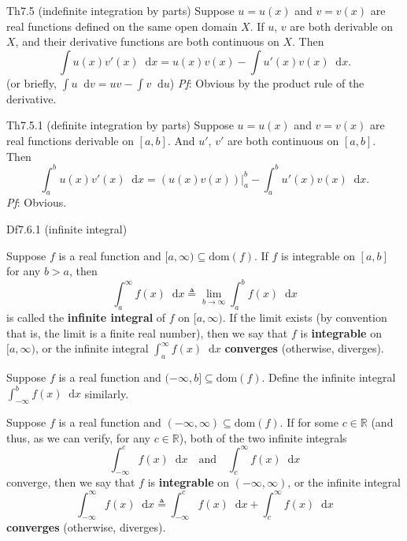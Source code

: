 \documentclass{article}
\newcommand{\dif}{\mathop{}\!\mathrm{d}}
\begin{document}
\begin{Th}{Th7.5 (indefinite integration by parts)}
    Suppose $u = u(x)$ and $v = v(x)$ are real functions defined on the same open domain $X$. If $u$, $v$ are both derivable on $X$, and their derivative functions are both continuous on $X$. Then
    $$\int u(x)v'(x)\dif x = u(x)v(x) - \int u'(x)v(x)\dif x.$$
    (or briefly, $\int u\dif v = uv - \int v\dif u$)
    \tcblower
    \textit{Pf}: Obvious by the product rule of the derivative.
\end{Th}

\begin{Th}{Th7.5.1 (definite integration by parts)}
    Suppose $u = u(x)$ and $v = v(x)$ are real functions derivable on $[a, b]$. And $u'$, $v'$ are both continuous on $[a, b]$. Then
    $$\int_a^b u(x)v'(x)\dif x = \left(u(x)v(x)\right)\Big|_a^b - \int_a^b u'(x)v(x)\dif x.$$
    \tcblower
    \textit{Pf}: Obvious.
\end{Th}

\begin{Df}{Df7.6.1 (infinite integral)}
    \begin{compactenum}
        \item Suppose $f$ is a real function and $[a, \infty)\subseteq\text{dom}(f)$. If $f$ is integrable on $[a, b]$ for any $b>a$, then 
        $$\int_a^\infty f(x)\dif x \triangleq \lim_{b\to\infty}\int_a^b f(x)\dif x$$
        is called the \textbf{infinite integral} of $f$ on $[a, \infty)$. If the limit exists (by convention that is, the limit is a finite real number), then we say that $f$ is \textbf{integrable} on $[a, \infty)$, or the infinite integral $\int_a^\infty f(x)\dif x$ \textbf{converges} (otherwise, diverges).
        \item Suppose $f$ is a real function and $(-\infty, b]\subseteq\text{dom}(f)$. Define the infinite integral $\int_{-\infty}^b f(x)\dif x$ similarly.
        \item Suppose $f$ is a real function and $(-\infty, \infty)\subseteq\text{dom}(f)$. If for some $c\in\mathbb{R}$ (\textcolor{Th}{and thus, as we can verify, for any $c\in\mathbb{R}$}), both of the two infinite integrals
        $$ \int_{-\infty}^c f(x)\dif x \quad \text{and} \quad \int_c^\infty f(x)\dif x $$
        converge, then we say that $f$ is \textbf{integrable} on $(-\infty, \infty)$, or the infinite integral 
        $$\int_{-\infty}^\infty f(x)\dif x \triangleq \int_{-\infty}^c f(x)\dif x + \int_c^\infty f(x)\dif x$$
        \textbf{converges} (otherwise, diverges).
    \end{compactenum}
\end{Df}
\end{document}
